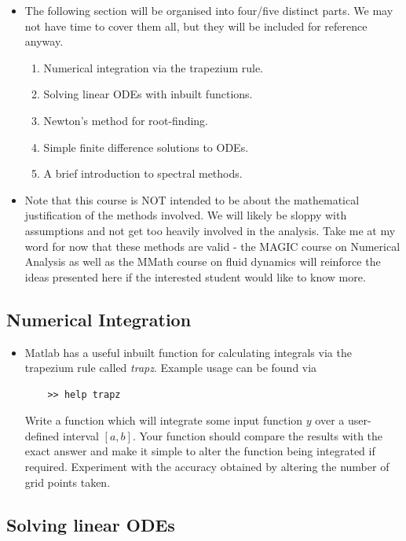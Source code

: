 \documentclass[12pt]{report}
\begin{document}
\begin{itemize}
	\item The following section will be organised into four/five distinct parts. We may not have time to cover them all, but they will be included for reference anyway.
	\begin{enumerate}
		\item Numerical integration via the trapezium rule.
		\item Solving linear ODEs with inbuilt functions.
		\item Newton's method for root-finding.
		\item Simple finite difference solutions to ODEs.
		\item A brief introduction to spectral methods.
	\end{enumerate}
	\item Note that this course is NOT intended to be about the mathematical justification of the methods involved. We will likely be sloppy with assumptions and not get too heavily involved in the analysis. Take me at my word for now that these methods are valid - the MAGIC course on Numerical Analysis as well as the MMath course on fluid dynamics will reinforce the ideas presented here if the interested student would like to know more.
\end{itemize}

\subsection*{Numerical Integration}

\begin{itemize}
	\item Matlab has a useful inbuilt function for calculating integrals via the trapezium rule called \textit{trapz}. Example usage can be found via
	\begin{lstlisting}
	>> help trapz
	\end{lstlisting}
	\begin{tcolorbox}[title=Task]
		Write a function which will integrate some input function $y$ over a user-defined interval $[a,b]$. Your function should compare the results with the exact answer and make it simple to alter the function being integrated if required. 
		\tcblower
		Experiment with the accuracy obtained by altering the number of grid points taken.
	\end{tcolorbox}
\end{itemize}

\subsection*{Solving linear ODEs}
\end{document}
